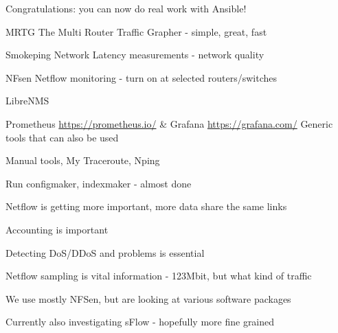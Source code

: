 \documentclass[Screen16to9,17pt]{foils}
\begin{document}
\vskip 5mm
\centerline{Congratulations: you can now do real work with Ansible!}



\begin{slidelist}
\item MRTG The Multi Router Traffic Grapher - simple, great, fast\\
\item Smokeping Network Latency measurements - network quality\\
\item NFsen Netflow monitoring - turn on at selected routers/switches
\item LibreNMS 
\item Prometheus \url{https://prometheus.io/} \& Grafana \url{https://grafana.com/} Generic tools that can also be used
\item Manual tools, My Traceroute, Nping
\end{slidelist}



\centerline{Run configmaker, indexmaker - almost done}






\begin{slidelist}
\item Netflow is getting more important, more data share the same links
\item Accounting is important
\item Detecting DoS/DDoS and problems is essential
\item Netflow sampling is vital information - 123Mbit, but what kind of traffic
\item We use mostly NFSen, but are looking at various software packages
\item Currently also investigating sFlow - hopefully more fine grained
\end{slidelist}
\end{document}
